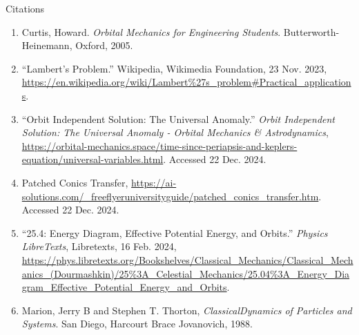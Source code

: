 \documentclass{article}
\numberwithin{figure}{section}
\begin{document}
\pagebreak
Citations
\begin{enumerate}
    \item Curtis, Howard. \textit{Orbital Mechanics for Engineering Students}. Butterworth-Heinemann, Oxford, 2005.
    \item “Lambert’s Problem.” Wikipedia, Wikimedia Foundation, 23 Nov. 2023, \url{https://en.wikipedia.org/wiki/Lambert%27s_problem#Practical_applications}.
    \item “Orbit Independent Solution: The Universal Anomaly.” \textit{Orbit Independent Solution: The Universal Anomaly - Orbital Mechanics \& Astrodynamics}, \url{https://orbital-mechanics.space/time-since-periapsis-and-keplers-equation/universal-variables.html}. Accessed 22 Dec. 2024.
    \item Patched Conics Transfer, \url{https://ai-solutions.com/_freeflyeruniversityguide/patched_conics_transfer.htm}. Accessed 22 Dec. 2024.
    \item “25.4: Energy Diagram, Effective Potential Energy, and Orbits.” \textit{Physics LibreTexts}, Libretexts, 16 Feb. 2024, \url{https://phys.libretexts.org/Bookshelves/Classical_Mechanics/Classical_Mechanics_(Dourmashkin)/25%3A_Celestial_Mechanics/25.04%3A_Energy_Diagram_Effective_Potential_Energy_and_Orbits}.
    \item Marion, Jerry B and Stephen T. Thorton, \textit{ClassicalDynamics of Particles and Systems}. San Diego, Harcourt Brace Jovanovich, 1988.
\end{enumerate}
\end{document}
